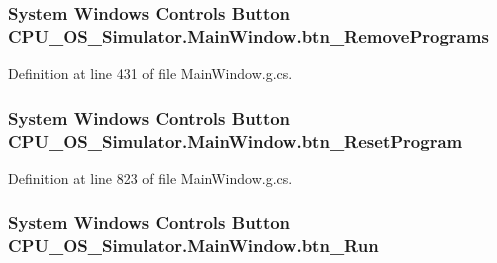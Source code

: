 \subsubsection[{btn\+\_\+\+Remove\+Programs}]{\setlength{\rightskip}{0pt plus 5cm}System Windows Controls Button C\+P\+U\+\_\+\+O\+S\+\_\+\+Simulator.\+Main\+Window.\+btn\+\_\+\+Remove\+Programs\hspace{0.3cm}{\ttfamily [package]}}\label{class_c_p_u___o_s___simulator_1_1_main_window_a7ec7ff768bad67e92cfcee280f24a4fb}


Definition at line 431 of file Main\+Window.\+g.\+cs.

\hypertarget{class_c_p_u___o_s___simulator_1_1_main_window_ada16565fc869dea1d54013009f5892b4}{}
\subsubsection[{btn\+\_\+\+Reset\+Program}]{\setlength{\rightskip}{0pt plus 5cm}System Windows Controls Button C\+P\+U\+\_\+\+O\+S\+\_\+\+Simulator.\+Main\+Window.\+btn\+\_\+\+Reset\+Program\hspace{0.3cm}{\ttfamily [package]}}\label{class_c_p_u___o_s___simulator_1_1_main_window_ada16565fc869dea1d54013009f5892b4}


Definition at line 823 of file Main\+Window.\+g.\+cs.

\hypertarget{class_c_p_u___o_s___simulator_1_1_main_window_ab3286e931d7154605876654bbf092840}{}
\subsubsection[{btn\+\_\+\+Run}]{\setlength{\rightskip}{0pt plus 5cm}System Windows Controls Button C\+P\+U\+\_\+\+O\+S\+\_\+\+Simulator.\+Main\+Window.\+btn\+\_\+\+Run\hspace{0.3cm}{\ttfamily [package]}}\label{class_c_p_u___o_s___simulator_1_1_main_window_ab3286e931d7154605876654bbf092840}


